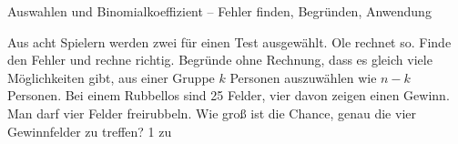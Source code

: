 \begin{aufgabe}{Auswahlen und Binomialkoeffizient – Fehler finden, Begründen, Anwendung}
\begin{teile}
\teil Aus acht Spielern werden zwei für einen Test ausgewählt. Ole rechnet so. Finde den Fehler und rechne richtig. 
\teil Begründe ohne Rechnung, dass es gleich viele Möglichkeiten gibt, aus einer Gruppe $k$ Personen auszuwählen wie $n - k$ Personen.
\teil Bei einem Rubbellos sind 25 Felder, vier davon zeigen einen Gewinn. Man darf vier Felder freirubbeln. Wie groß ist die Chance, genau die vier Gewinnfelder zu treffen? 1 zu \leerfeld
\end{teile}
\end{aufgabe}
